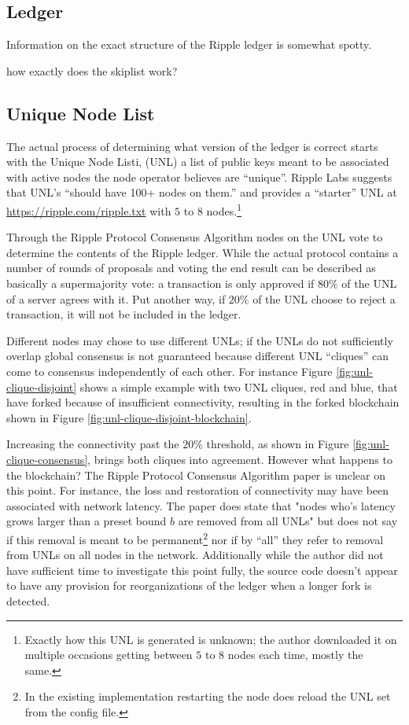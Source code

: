 \documentclass{article}
\begin{document}
\subsection{Ledger}

Information on the exact structure of the Ripple ledger is somewhat spotty.

how exactly does the skiplist work?


\subsection{Unique Node List}

The actual process of determining what version of the ledger is correct starts
with the Unique Node Listi, (UNL) a list of public keys meant to be associated
with active nodes the node operator believes are
``unique''.\cite{ripple-wiki-unl} Ripple Labs suggests that UNL's ``should have
100+ nodes on them.''\cite{ripple-wiki-unl} and provides a ``starter'' UNL at
\url{https://ripple.com/ripple.txt} with $5$ to $8$ nodes.\footnote{Exactly how this UNL is
generated is unknown; the author downloaded it on multiple occasions getting
between $5$ to $8$ nodes each time, mostly the same.}

Through the Ripple Protocol Consensus Algorithm\cite{ripple-consensus-paper}
nodes on the UNL vote to determine the contents of the Ripple ledger. While the
actual protocol contains a number of rounds of proposals and voting the end
result can be described as basically a supermajority vote: a transaction is
only approved if $80\%$ of the UNL of a server agrees with
it.\cite[3.2]{ripple-consensus-paper} Put another way, if $20\%$ of the UNL
choose to reject a transaction, it will not be included in the ledger.

Different nodes may chose to use different UNLs; if the UNLs do not
sufficiently overlap global consensus is not guaranteed because different UNL
``cliques'' can come to consensus independently of each other. For instance
Figure \ref{fig:unl-clique-disjoint} shows a simple example with two UNL
cliques, red and blue, that have forked because of insufficient connectivity,
resulting in the forked blockchain shown in Figure \ref{fig:unl-clique-disjoint-blockchain}.

Increasing the connectivity past the $20\%$ threshold, as shown in Figure
\ref{fig:unl-clique-consensus}, brings both cliques into agreement. However
what happens to the blockchain? The Ripple Protocol Consensus Algorithm paper
is unclear on this point. For instance, the loss and restoration of
connectivity may have been associated with network latency. The paper does
state that "nodes who’s latency grows larger than a preset bound $b$ are
removed from all UNLs"\cite[3.4.1]{ripple-consensus-paper} but does not say if
this removal is meant to be permanent\footnote{In the existing implementation
restarting the node does reload the UNL set from the config file.} nor if by
``all'' they refer to removal from UNLs on all nodes in the network.
Additionally while the author did not have sufficient time to investigate this
point fully, the source code doesn't appear to have any provision for
reorganizations of the ledger when a longer fork is detected.
\end{document}
